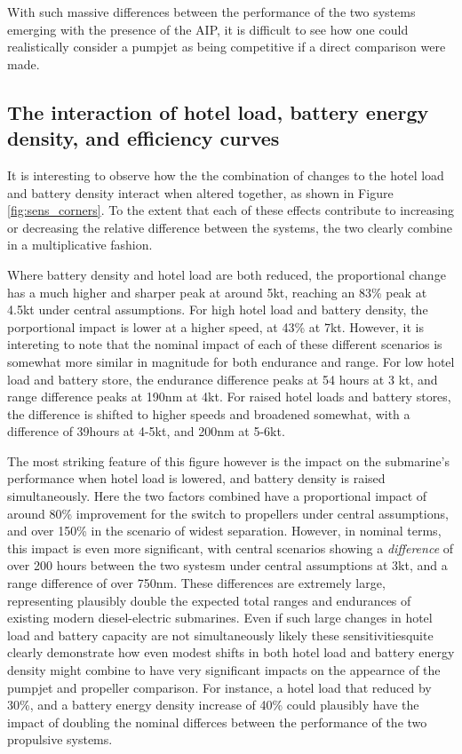 \documentclass{article}\usepackage[]{graphicx}\usepackage[]{color}
\begin{document}
With such massive differences between the performance of the two systems emerging with the presence of the AIP, it is difficult to see how one could realistically consider a pumpjet as being competitive if a direct comparison were made.

\subsection{The interaction of hotel load, battery energy density, and efficiency curves}
It is interesting to observe how the the combination of changes to the hotel load and battery density interact when altered together, as shown in Figure \ref{fig:sens_corners}.  To the extent that each of these effects contribute to increasing or decreasing the relative difference between the systems, the two clearly combine in a multiplicative fashion.

Where battery density and hotel load are both reduced, the proportional change has a much higher and sharper peak at around 5kt, reaching an 83\% peak at 4.5kt under central assumptions.  For high hotel load and battery density, the porportional impact is lower at a higher speed, at 43\% at 7kt. However, it is intereting to note that the nominal impact of each of these different scenarios is somewhat more similar in magnitude for both endurance and range.  For low hotel load and battery store, the endurance difference peaks at 54 hours at 3 kt, and range difference peaks at 190nm at 4kt.  For raised hotel loads and battery stores, the difference is shifted to higher speeds and broadened somewhat, with a difference of 39hours at 4-5kt, and 200nm at 5-6kt.

The most striking feature of this figure however is the impact on the submarine's performance when hotel load is lowered, and battery density is raised simultaneously.  Here the two factors combined have a proportional impact of around 80\% improvement for the switch to propellers under central assumptions, and over 150\% in the scenario of widest separation.  However, in nominal terms, this impact is even more significant, with central scenarios showing a \textit{difference} of over 200 hours between the two systesm under central assumptions at 3kt, and a range difference of over 750nm.  These differences are extremely large, representing plausibly double the expected total ranges and endurances of existing modern diesel-electric submarines. Even if such large changes in hotel load and battery capacity are not simultaneously likely these sensitivitiesquite clearly demonstrate how even modest shifts in both hotel load and battery energy density might combine to have very significant impacts on the appearnce of the pumpjet and propeller comparison.  For instance, a hotel load that reduced by 30\%, and a battery energy density increase of 40\% could plausibly have the impact of doubling the nominal differces between the performance of the two propulsive systems.
\end{document}
